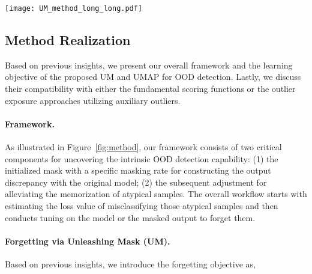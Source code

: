 \documentclass{article}
\theoremstyle{plain}
\theoremstyle{definition}
\theoremstyle{remark}
\begin{document}
\begin{figure*}[t!]
\begin{center}
    \hspace{-0.20in}
\texttt{[image: UM\_method\_long\_long.pdf]}
\end{center}
\vspace{-3mm}
\caption{\textbf{Overview of Unleashing Mask:} Given a well-trained model, we initialize a mask for mining the atypical samples that are sensitive to the changes in model parameters. Then we finetune the original model or adopt pruning with the estimated forgetting threshold, i.e., the loss value estimated by the UM. The final model can serve as the base of those representative score functions to utilize the discriminative features and also as a new initialization of outlier exposure methods. In addition, we also present examples of misclassified samples in ID data after masking the original well-trained model, and loss value using the masked outputs w.r.t. different mask ratios.
}
\label{fig:method}
\vspace{-4mm}
\end{figure*}

\subsection{Method Realization}
\label{sec:method_part3}

Based on previous insights, we present our overall framework and the learning objective of the proposed UM and UMAP for OOD detection. Lastly, we discuss their compatibility with either the fundamental scoring functions or the outlier exposure approaches utilizing auxiliary outliers.

\paragraph{Framework.} As illustrated in Figure~\ref{fig:method}, our framework consists of two critical components for uncovering the intrinsic OOD detection capability: (1) the initialized mask with a specific masking rate for constructing the output discrepancy with the original model; (2) the subsequent adjustment for alleviating the memorization of atypical samples. The overall workflow starts with estimating the loss value of misclassifying those atypical samples and then conducts tuning on the model or the masked output to forget them.
\paragraph{Forgetting via Unleashing Mask (UM).} Based on previous insights, we introduce the forgetting objective as,
\end{document}
